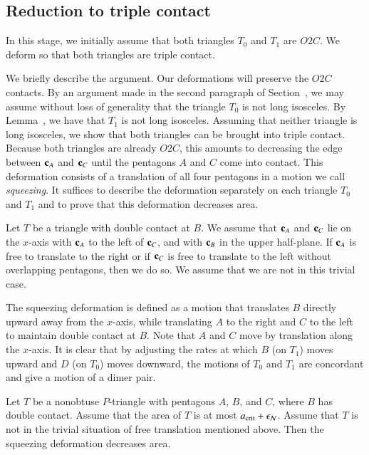\subsection{Reduction to triple contact}

In this stage, we initially assume that both triangles $T_0$ and $T_1$
are $O2C$.  We deform so that both triangles are triple contact.

We briefly describe the argument.  Our deformations will preserve the
$O2C$ contacts.  By an argument made in the second paragraph of
Section~, we may assume without loss of generality that
the triangle $T_0$ is not long isosceles.  By
Lemma~, we have that $T_1$ is not long
isosceles.  Assuming that neither triangle is long isosceles, we show
that both triangles can be brought into triple contact.  Because both
triangles are already $O2C$, this amounts to decreasing the edge
between ${\mathbf c}_A$ and ${\mathbf c}_C$ until the pentagons $A$ and $C$ come into
contact.  This deformation consists of a translation of all four
pentagons in a motion we call {\it squeezing}.  It suffices to
describe the deformation separately on each triangle $T_0$ and $T_1$
and to prove that this deformation decreases area.

Let $T$ be a triangle with double contact at $B$.  We assume that
${\mathbf c}_A$ and ${\mathbf c}_C$ lie on the $x$-axis with ${\mathbf c}_A$ to the left of
${\mathbf c}_C$, and with ${\mathbf c}_B$ in the upper half-plane.  If ${\mathbf c}_A$ is free to
translate to the right or if ${\mathbf c}_C$ is free to translate to the left
without overlapping pentagons, then we do so.  We assume that we are
not in this trivial case.

The squeezing deformation is defined as a motion that translates $B$
directly upward away from the $x$-axis, while translating $A$ to the
right and $C$ to the left to maintain double contact at $B$.  Note
that $A$ and $C$ move by translation along the $x$-axis.  It is clear
that by adjusting the rates at which $B$ (on $T_1$) moves upward and
$D$ (on $T_0$) moves downward, the motions of $T_0$ and $T_1$ are
concordant and give a motion of a dimer pair.

\begin{lemma}  
  Let $T$ be a nonobtuse $P$-triangle with pentagons $A$, $B$, and
  $C$, where $B$ has double contact.  Assume that the area of $T$ is
  at most $a_\text{crit}+\epsilon_{\mathcal N}$.  Assume that $T$ is not in the trivial
  situation of free translation mentioned above.  Then the squeezing
  deformation decreases area.
\end{lemma}

